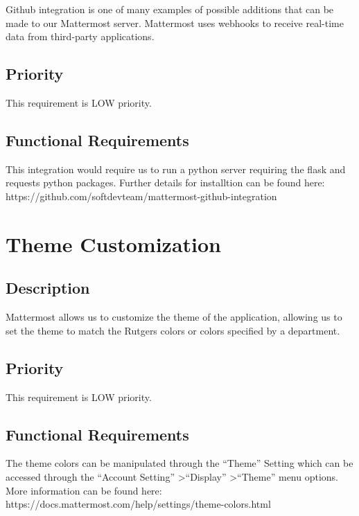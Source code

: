 \documentclass{scrreprt}
\begin{document}
Github integration is one of many examples of possible additions that can be
made to our Mattermost server.  Mattermost uses webhooks to receive real-time
data from third-party applications.
\subsection{Priority}
This requirement is LOW priority.
\subsection{Functional Requirements}
This integration would require us to run a python server requiring the flask
and requests python packages.  Further details for installtion can be found
here: https://github.com/softdevteam/mattermost-github-integration

\section{Theme Customization}
\subsection{Description}
Mattermost allows us to customize the theme of the application, allowing us to
set the theme to match the Rutgers colors or colors specified by a department.
\subsection{Priority}
This requirement is LOW priority.
\subsection{Functional Requirements}
The theme colors can be manipulated through the ``Theme'' Setting which can be
accessed through the ``Account Setting'' \textgreater ``Display'' \textgreater ``Theme'' menu
options.  More information can be found here:
https://docs.mattermost.com/help/settings/theme-colors.html
\end{document}
